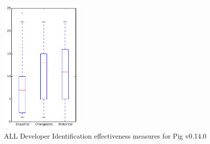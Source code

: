 
\begin{figure}[t]
\centering
\includegraphics[width=0.36\textwidth]{figures/dit/all_pig}
\caption{ALL Developer Identification effectiveness measures for Pig v0.14.0}
\label{fig:dit:all:pig}
\end{figure}
